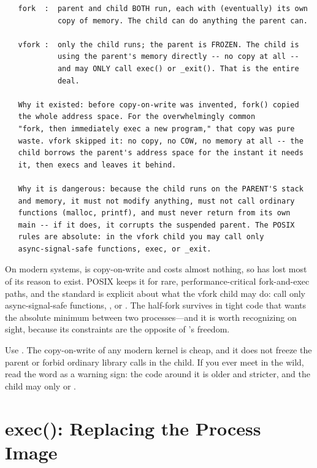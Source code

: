 \begin{verbatim}
   fork  :  parent and child BOTH run, each with (eventually) its own
            copy of memory. The child can do anything the parent can.

   vfork :  only the child runs; the parent is FROZEN. The child is
            using the parent's memory directly -- no copy at all --
            and may ONLY call exec() or _exit(). That is the entire
            deal.

   Why it existed: before copy-on-write was invented, fork() copied
   the whole address space. For the overwhelmingly common
   "fork, then immediately exec a new program," that copy was pure
   waste. vfork skipped it: no copy, no COW, no memory at all -- the
   child borrows the parent's address space for the instant it needs
   it, then execs and leaves it behind.

   Why it is dangerous: because the child runs on the PARENT'S stack
   and memory, it must not modify anything, must not call ordinary
   functions (malloc, printf), and must never return from its own
   main -- if it does, it corrupts the suspended parent. The POSIX
   rules are absolute: in the vfork child you may call only
   async-signal-safe functions, exec, or _exit.
\end{verbatim}

On modern systems,  is copy-on-write and costs almost
nothing, so  has lost most of its reason to exist. POSIX
keeps it for rare, performance-critical fork-and-exec paths, and the
standard is explicit about what the vfork child may do: call only
async-signal-safe functions, , or . The
half-fork survives in tight code that wants the absolute minimum
between two processes---and it is worth recognizing on sight, because
its constraints are the opposite of 's freedom.

\begin{ruleofthumb}
Use . The copy-on-write  of any modern kernel
is cheap, and it does not freeze the parent or forbid ordinary
library calls in the child. If you ever meet  in the
wild, read the word as a warning sign: the code around it is older
and stricter, and the child may only  or .
\end{ruleofthumb}

\section{exec(): Replacing the Process Image}

